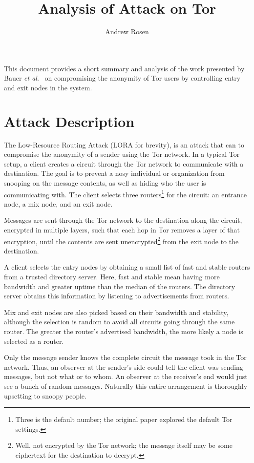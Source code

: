 \documentclass[10pt,a4paper]{article}
\author{Andrew Rosen}
\title{Analysis of Attack on Tor}
\begin{document}
\maketitle

This document provides a short summary and analysis of the work presented by Bauer \textit{et al}.\  \cite{bauerlow} on compromising the anonymity of Tor \cite{dingledine2004tor} users by controlling entry and exit nodes in the system.


\section{Attack Description}
The Low-Resource Routing Attack (LORA for brevity), is an attack that can to compromise the anonymity of a sender using the Tor network.
In a typical Tor setup, a client creates a circuit through the Tor network to communicate with a destination.
The goal is to prevent a nosy individual or organization from snooping on the message contents, as well as hiding who the user is communicating with.
The client selects three routers\footnote{Three is the default number; the original paper explored the default Tor settings.} for the circuit: an entrance node, a mix node, and an exit node.

Messages are sent through the Tor network to the destination along the circuit, encrypted in multiple layers, such that each hop in Tor removes a layer of that encryption, until the contents are sent unencrypted\footnote{Well, not encrypted by the Tor network; the message itself may be some ciphertext for the destination to decrypt.}  from the exit node to the destination.

A client selects the entry nodes by obtaining a small list of fast and stable routers from a trusted directory server. 
Here, fast and stable mean having more bandwidth and greater uptime than the median of the routers.
The directory server obtains this information by listening to advertisements from routers.

Mix and exit nodes are also picked based on their bandwidth and stability, although the selection is random to avoid all circuits going through the same router.
The greater the router's advertised bandwidth, the more likely a node is selected as a router.

Only the message sender knows the complete circuit the message took in the Tor network.
Thus, an observer at the sender's side could tell the client was sending messages, but not what or to whom.
An observer at the receiver's end would just see a bunch of random messages.
Naturally this entire arrangement is thoroughly upsetting to snoopy people.
\end{document}
